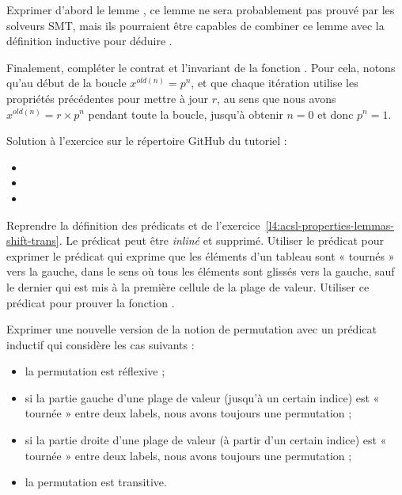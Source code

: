 

Exprimer d'abord le lemme , ce lemme ne sera probablement
pas prouvé par les solveurs SMT, mais ils pourraient être capables de combiner ce
lemme avec la définition inductive pour déduire .


Finalement, compléter le contrat et l'invariant de la fonction .
Pour cela, notons qu'au début de la boucle $x^{old(n)} = p^n$, et que chaque itération
utilise les propriétés précédentes pour mettre à jour $r$, au sens que nous avons
$x^{old(n)} = r \times p^n$ pendant toute la boucle, jusqu'à obtenir $n = 0$ et donc
$p^n = 1$.


\begin{Information}
  Solution à l'exercice sur le répertoire GitHub du tutoriel :
  \begin{itemize}
    \item {}
    \item {}
    \item {}
  \end{itemize}
\end{Information}





Reprendre la définition des prédicats  et 
de l'exercice~\ref{l4:acsl-properties-lemmas-shift-trans}. Le prédicat
 peut être \textit{inliné} et supprimé. Utiliser le prédicat
 pour exprimer le prédicat  qui exprime que
les éléments d'un tableau sont « tournés » vers la gauche, dans le sens où tous les
éléments sont glissés vers la gauche, sauf le dernier qui est mis à la première
cellule de la plage de valeur. Utiliser ce prédicat pour prouver la fonction
.





Exprimer une nouvelle version de la notion de permutation avec un prédicat inductif
qui considère les cas suivants :
\begin{itemize}
\item la permutation est réflexive ;
\item si la partie gauche d'une plage de valeur (jusqu'à un certain indice) est
      « tournée » entre deux labels, nous avons toujours une permutation ;
\item si la partie droite d'une plage de valeur (à partir d'un certain indice)
      est « tournée » entre deux labels, nous avons toujours une permutation ;
\item la permutation est transitive.
\end{itemize}


